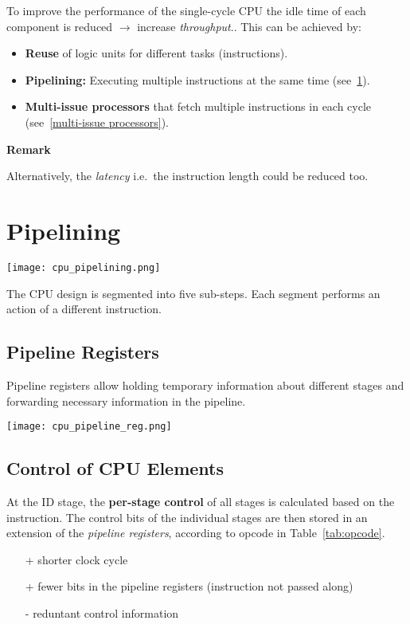 \begin{multicols*}{2}
    To improve the performance of the single-cycle CPU the idle time of each component is reduced  $\to$ increase \textit{throughput}.. This can be achieved by:

    \begin{itemize}
        \item \textbf{Reuse} of logic units for different tasks (instructions).
        \item \textbf{Pipelining:} Executing multiple instructions at the same time (see~\ref{pipelining}).
        \item \textbf{Multi-issue processors} that fetch multiple instructions in each cycle (see~\ref{multi-issue processors}).
    \end{itemize}

    \textbf{Remark}

    Alternatively, the \textit{latency} i.e.\ the instruction length could be reduced too.

    \section{Pipelining}\label{pipelining}

    \texttt{[image: cpu\_pipelining.png]}

    The CPU design is segmented into five sub-steps. Each segment performs an action of a different instruction.

    \subsection{Pipeline Registers}
    Pipeline registers allow holding temporary information about different stages and forwarding necessary information in the pipeline.
    \begin{center}
        \texttt{[image: cpu\_pipeline\_reg.png]}
    \end{center}

    \subsection{Control of CPU Elements}
    At the ID stage, the \textbf{per-stage control} of all stages is calculated based on the instruction.
    The control bits of the individual stages are then stored in an extension of the \textit{pipeline registers}, according to opcode in Table~\ref{tab:opcode}.
    \begin{itemize}
        \item[+] shorter clock cycle
        \item[+] fewer bits in the pipeline registers (instruction not passed along)
        \item[-] reduntant control information
    \end{itemize}


\end{multicols*}
